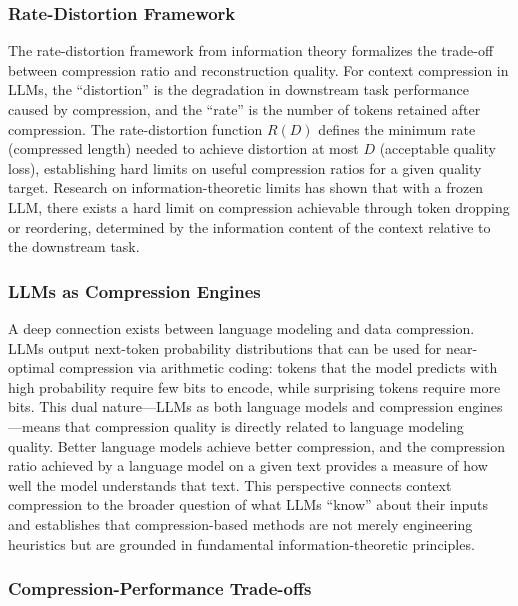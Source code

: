 \documentclass[11pt,letterpaper]{article}
\begin{document}
\subsubsection{Rate-Distortion Framework}

The rate-distortion framework from information theory formalizes the trade-off between compression ratio and reconstruction quality. For context compression in LLMs, the ``distortion'' is the degradation in downstream task performance caused by compression, and the ``rate'' is the number of tokens retained after compression. The rate-distortion function $R(D)$ defines the minimum rate (compressed length) needed to achieve distortion at most $D$ (acceptable quality loss), establishing hard limits on useful compression ratios for a given quality target. Research on information-theoretic limits has shown that with a frozen LLM, there exists a hard limit on compression achievable through token dropping or reordering, determined by the information content of the context relative to the downstream task.

\subsubsection{LLMs as Compression Engines}

A deep connection exists between language modeling and data compression. LLMs output next-token probability distributions that can be used for near-optimal compression via arithmetic coding: tokens that the model predicts with high probability require few bits to encode, while surprising tokens require more bits. This dual nature---LLMs as both language models and compression engines---means that compression quality is directly related to language modeling quality. Better language models achieve better compression, and the compression ratio achieved by a language model on a given text provides a measure of how well the model understands that text. This perspective connects context compression to the broader question of what LLMs ``know'' about their inputs and establishes that compression-based methods are not merely engineering heuristics but are grounded in fundamental information-theoretic principles.

\subsubsection{Compression-Performance Trade-offs}
\end{document}
